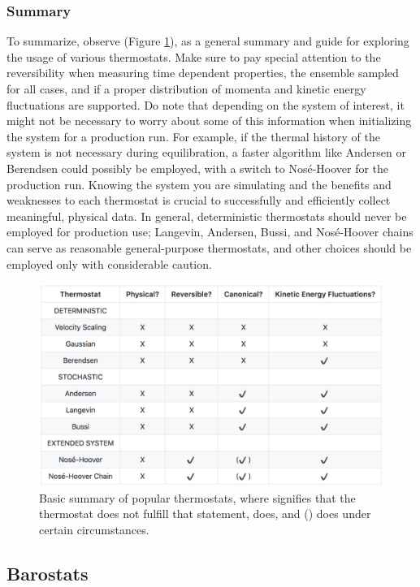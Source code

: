 \documentclass[9pt,bestpractices]{livecoms}
\begin{document}
\subsubsection{Summary}
To summarize, observe (Figure \ref{tstat_summary}), as a general summary and guide for exploring the usage of various thermostats.
Make sure to pay special attention to the reversibility when measuring time dependent properties, the ensemble sampled for all cases, and if a proper distribution of momenta and kinetic energy fluctuations are supported.
Do note that depending on the system of interest, it might not be necessary to worry about some of this information when initializing the system for a production run.
For example, if the thermal history of the system is not necessary during equilibration, a faster algorithm like Andersen or Berendsen could possibly be employed, with a switch to Nos\'{e}-Hoover for the production run.
Knowing the system you are simulating and the benefits and weaknesses to each thermostat is crucial to successfully and efficiently collect meaningful, physical data.
In general, deterministic thermostats should never be employed for production use; Langevin, Andersen, Bussi, and Nos\'{e}-Hoover chains can serve as reasonable general-purpose thermostats, and other choices should be employed only with considerable caution.

\begin{figure}[h]
\centering
\includegraphics[width=\linewidth]{thermostat_summary.pdf}
    \caption{Basic summary of popular thermostats, where  signifies
    that the thermostat does not fulfill that statement,  does, and
    () does under certain circumstances.}\label{tstat_summary}
\end{figure}

\subsection{Barostats}\label{sec:barostats}
\end{document}
